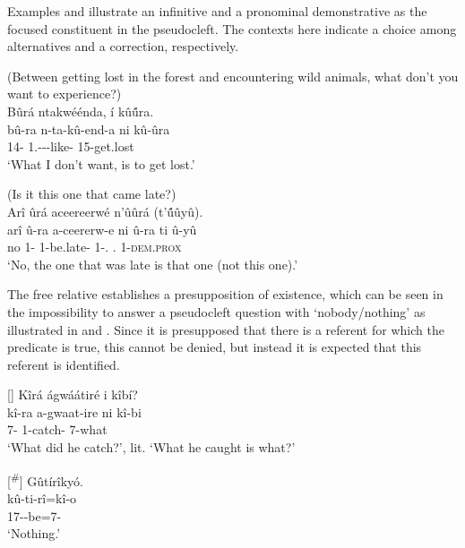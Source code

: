 \documentclass[output=paper]{langscibook}
\begin{document}
Examples  and  illustrate an infinitive and a pronominal demonstrative as the focused constituent in the pseudocleft. The contexts here indicate a choice among alternatives and a correction, respectively.

\ea
\label{bkm:Ref111650296}
(Between getting lost in the forest and encountering wild animals, what don’t you want to experience?)\\
Bûrá ntakwéénda, í kû\'{û}ra.\\
\gll
bû-ra  n-ta-kû-end-a  ni  kû-ûra\\
14-\RM{} 1\SG.\SM-\NEG{}-\PRS{}-like-\FV{} \COP{} 15-get.lost\\
\glt
‘What I don’t want, is to get lost.’

\ex
\label{bkm:Ref111650297}
(Is it this one that came late?)\\
Arî ûrá aceereerwé n’ûûrá (t’\'{û}ûyû).\\
\gll
arî  û-ra  a-ceererw-e  ni  û-ra  ti  û-yû\\
no  1-\RM{} 1\SM{}-be.late-\PFV{} \COP{} 1-\DEM.\DIST{} \NEG.\COP{}  \textsc{1-dem.prox}\\
\glt ‘No, the one that was late is that one (not this one).’

\z

The free relative establishes a presupposition of existence, which can be seen in the impossibility to answer a pseudocleft question with ‘nobody/nothing’ as illustrated in  and . Since it is presupposed that there is a referent for which the predicate is true, this cannot be denied, but instead it is expected that this referent is identified.

\ea
\label{bkm:Ref111806764}
\ea
[]{
Kîrá ágwáátiré i kîbí?\\
\gll
kî-ra  a-gwaat-ire  ni  kî-bi\\
7-\RM{} 1\SM{}-catch-\PFV{} \COP{} 7-what \\
\glt
‘What did he catch?’, lit. ‘What he caught is what?’
}

\ex
[\textsuperscript{\#}]{
Gûtírîkyó.\\
\gll
kû-ti-rî=kî-o\\
17\SM-\NEG{}-be=7-\PRO{}\\
\glt
‘Nothing.’
}
\end{document}
